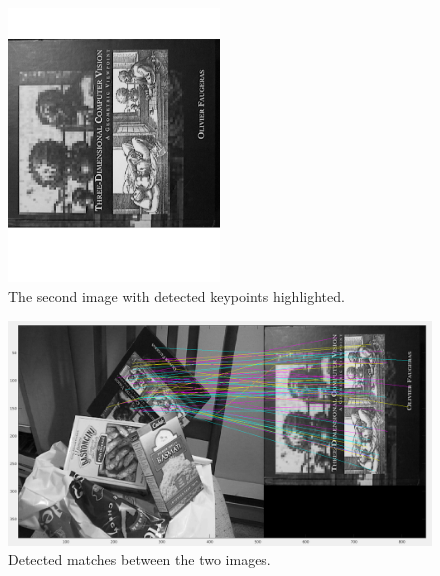 \begin{figure}[H]
  \includegraphics[width=0.5\textwidth]{img2}
  \caption{The second image with detected keypoints highlighted.}
\end{figure}

\begin{figure}[H]
  \includegraphics[width=1\textwidth]{matches}
  \caption{Detected matches between the two images.}
\end{figure}


